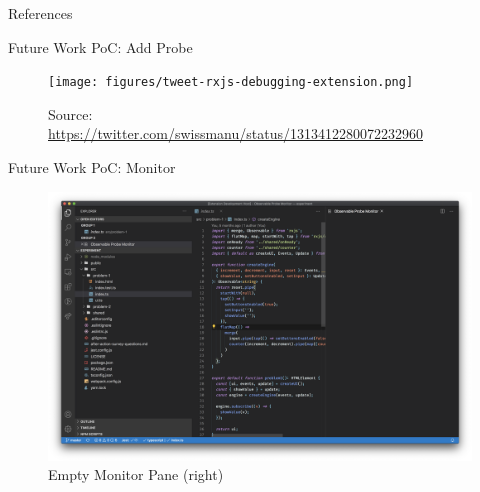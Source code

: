 \documentclass[aspectratio=169]{beamer}
\begin{document}
\begin{frame}
  \centering
  \vfill
  {\fontsize{40}{50}\selectfont\color{white}{Q \& A}}
  \vfill
\end{frame}


\appendix
\begin{frame}[allowframebreaks]{References}
	\printbibliography
\end{frame}

\begin{frame}{}
    \centering
    \vfill
    {\fontsize{30}{40}\selectfont\color{white}{Backup Slides}}
    \vfill
\end{frame}

\begin{frame}[fragile]{Future Work PoC: Add Probe}
    \begin{figure}[H]
        \centering
        \texttt{[image: figures/tweet-rxjs-debugging-extension.png]}
        \caption{\tiny{Source: \url{https://twitter.com/swissmanu/status/1313412280072232960}}}
    \end{figure}
\end{frame}

\begin{frame}[fragile]{Future Work PoC: Monitor}
    \begin{figure}[H]
        \centering
        \includegraphics[height=0.7\textheight]{figures/backup-screenshots/step5-2.png}
        \caption{Empty Monitor Pane (right)}
    \end{figure}
\end{frame}
\end{document}
